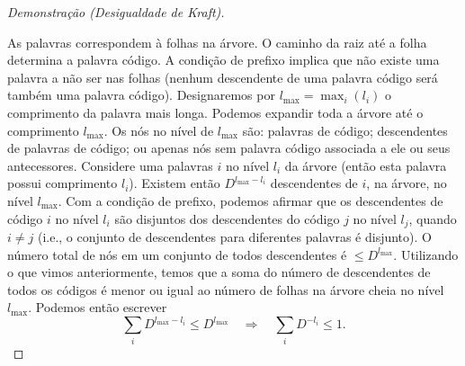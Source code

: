 \begin{proof}[Demonstração (Desigualdade de Kraft)]
\begin{marginfigure}
{
}
\caption{Árvore $D$-ária.}\label{fig:Dtree}
\end{marginfigure}

As palavras correspondem à folhas na árvore. O caminho da raiz até a folha determina a palavra código.
A condição de prefixo implica que não existe uma palavra a não ser nas folhas
(nenhum descendente de uma palavra código será também uma palavra código).
Designaremos por $l_{\text{max}} = \max_i (l_i)$ o comprimento da palavra mais longa.
Podemos expandir toda a árvore até o comprimento $l_{\text{max}}$.
Os nós no nível de $l_{\text{max}}$ são: palavras de código; descendentes de palavras de código; ou
apenas nós sem palavra código associada a ele ou seus antecessores.
Considere uma palavras $i$ no nível $l_i$ da árvore (então esta palavra possui comprimento $l_i$).
Existem então $D^{l_{\text{max}} - l_i}$ descendentes de $i$, na árvore, no nível $l_{\text{max}}$.
Com a condição de prefixo, podemos afirmar que os descendentes de código $i$ no nível $l_i$ são
disjuntos dos descendentes do código $j$ no nível $l_j$, quando $i \neq j$ (i.e., o conjunto de
descendentes para diferentes palavras é disjunto).
O número total de nós em um conjunto de todos descendentes é $\leq D^{l_{\text{max}}}$.
Utilizando o que vimos anteriormente, temos que a soma do número de descendentes de todos os códigos é menor ou
igual ao número de folhas na árvore cheia no nível $l_{\text{max}}$. Podemos então escrever
\begin{equation}
\sum_i D^{l_{\text{max}} - l_i} \leq D^{l_{\text{max}}} \quad \Rightarrow \quad \sum_i D^{-l_i} \leq 1 .
\end{equation}


\end{proof}
